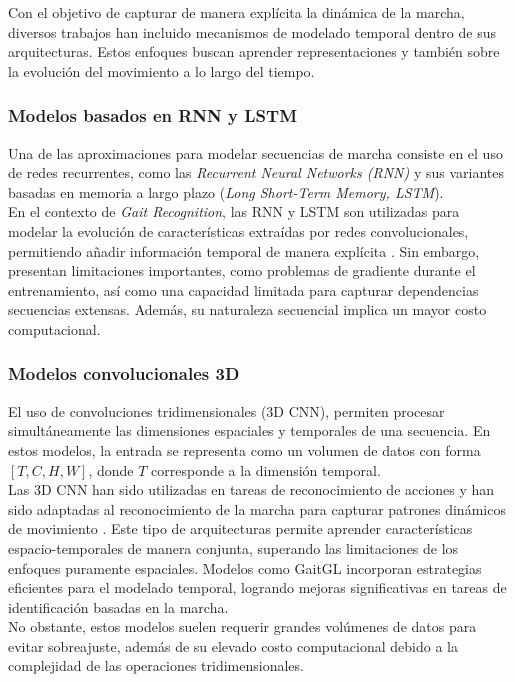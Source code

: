 Con el objetivo de capturar de manera explícita la dinámica de la marcha, diversos trabajos han incluido mecanismos de modelado temporal dentro de sus arquitecturas. Estos enfoques buscan aprender representaciones y también sobre la evolución del movimiento a lo largo del tiempo.

\subsubsection{Modelos basados en RNN y LSTM}

Una de las aproximaciones para modelar secuencias de marcha consiste en el uso de redes recurrentes, como las \textit{Recurrent Neural Networks (RNN)} y sus variantes basadas en memoria a largo plazo (\textit{Long Short-Term Memory, LSTM}). \\
En el contexto de \textit{Gait Recognition}, las RNN y LSTM son utilizadas para modelar la evolución de características extraídas por redes convolucionales, permitiendo añadir información temporal de manera explícita \cite{ReferenciaRNNGait}. Sin embargo, presentan limitaciones importantes, como problemas de gradiente durante el entrenamiento, así como una capacidad limitada para capturar dependencias secuencias extensas. Además, su naturaleza secuencial implica un mayor costo computacional.

\subsubsection{Modelos convolucionales 3D}

El uso de convoluciones tridimensionales (3D CNN), permiten procesar simultáneamente las dimensiones espaciales y temporales de una secuencia. En estos modelos, la entrada se representa como un volumen de datos con forma $[T, C, H, W]$, donde $T$ corresponde a la dimensión temporal. \\
Las 3D CNN han sido utilizadas en tareas de reconocimiento de acciones y han sido adaptadas al reconocimiento de la marcha para capturar patrones dinámicos de movimiento \cite{Referencia3DCNN}. Este tipo de arquitecturas permite aprender características espacio-temporales de manera conjunta, superando las limitaciones de los enfoques puramente espaciales. Modelos como GaitGL \cite{Lin2022GaitGL} incorporan estrategias eficientes para el modelado temporal, logrando mejoras significativas en tareas de identificación basadas en la marcha. \\
No obstante, estos modelos suelen requerir grandes volúmenes de datos para evitar sobreajuste, además de su elevado costo computacional debido a la complejidad de las operaciones tridimensionales.

